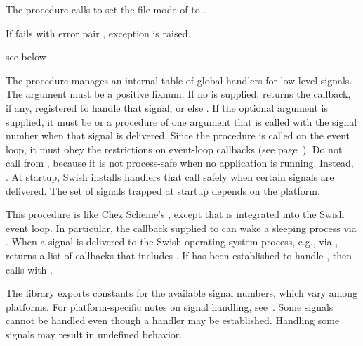 The  procedure calls  to set the
file mode of  to .

If  fails with error pair , exception  is raised.

\begin{procedure}
\end{procedure}
\returns{} see below

The  procedure manages an internal table of
global handlers for low-level signals.
The  argument must be a positive fixnum.
If no  is supplied,  returns the
callback, if any, registered to handle that signal, or else .
If the optional  argument is supplied, it must be  or
a procedure of one argument that is called with the signal number when
that signal is delivered.
Since the  procedure is called on the event loop, it must obey
the restrictions on event-loop callbacks (see page~\pageref{page:event-loop}).
Do not call  from , because it is not
process-safe when no application is running.
Instead, .
At startup, Swish installs handlers that call 
safely when certain signals are delivered.
The set of signals trapped at startup depends on the platform.

This procedure is like Chez Scheme's , except
that  is integrated into the Swish event loop.
In particular, the callback supplied to  can wake a
sleeping process via .
When a signal  is delivered to the Swish operating-system process,
e.g., via ,  returns a list of
callbacks that includes .
If  has been established to handle ,
then  calls  with .

The  library exports constants for the available signal
numbers, which vary among platforms.
For platform-specific notes on signal handling, see~\cite{libuv}.
Some signals cannot be handled even though a handler may be established.
Handling some signals may result in undefined behavior.

